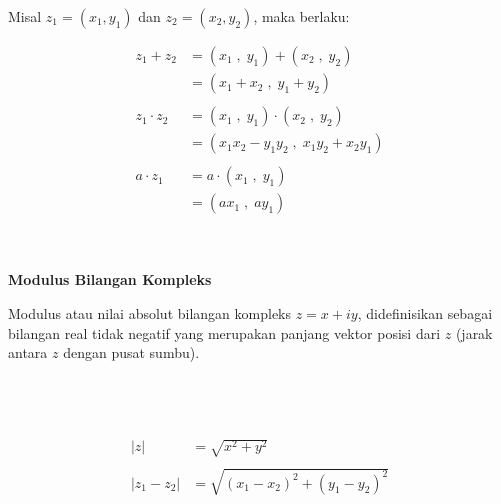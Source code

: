 \documentclass{article}
\begin{document}
    Misal $ z_1 = ( x_1 , y_1 )  $ dan $ z_2 = ( x_2 , y_2 ) $, maka berlaku:

    \begin{align}
            z_1 + z_2   & = ( x_1 \;,\; y_1 ) + ( x_2 \;,\; y_2 )
            \nonumber\\
            & = ( x_1 + x_2 \;,\; y_1 + y_2 )
            \\\nonumber\\
            z_1 \cdot z_2   & = ( x_1 \;,\; y_1 ) \cdot ( x_2 \;,\; y_2 )
                            \nonumber\\
                            & = ( x_1 x_2 - y_1 y_2 \;,\; x_1 y_2 + x_2 y_1 )
                            \\\nonumber\\
            a \cdot z_1 & = a \cdot ( x_1 \;,\; y_1 )
                        \nonumber\\
                        & = ( ax_1 \;,\; ay_1 )
    \end{align}
    \\ \\

    \newpage
    \begin{center}
        \textbf{Modulus Bilangan Kompleks}
    \end{center}

    Modulus atau nilai absolut bilangan kompleks $ z = x + iy $, didefinisikan sebagai bilangan real tidak negatif yang merupakan panjang vektor posisi dari $z$ (jarak antara $z$ dengan pusat sumbu).
    \\ \\

    \\ \\

    \begin{align}
        |z|         &= \sqrt{x^2+y^2}
        \\\nonumber\\
        |z_1 - z_2| &= \sqrt{(x_1-x_2)^2 + (y_1-y_2)^2}
    \end{align}
    \\ \\
\end{document}
